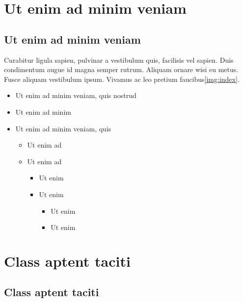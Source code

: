 \section{Ut enim ad minim veniam}

\lipsum[2-4]

\subsection{Ut enim ad minim veniam}

Curabitur ligula sapien, pulvinar a vestibulum quis, facilisis vel sapien. Duis
condimentum augue id magna semper rutrum. Aliquam ornare wisi eu metus. Fusce
aliquam vestibulum ipsum. Vivamus ac leo pretium faucibus\ref{img:index}.

\begin{itemize}
    \item Ut enim ad minim veniam, quis nostrud
    \item Ut enim ad minim
    \item Ut enim ad minim veniam, quis
    \begin{itemize}
        \item Ut enim ad
        \item Ut enim ad
        \begin{itemize}
            \item Ut enim
            \item Ut enim
            \begin{itemize}
            \item Ut enim
            \item Ut enim
        \end{itemize}
        \end{itemize}
    \end{itemize}
\end{itemize}

\section{Class aptent taciti}

\lipsum[2]

\subsection{Class aptent taciti}

